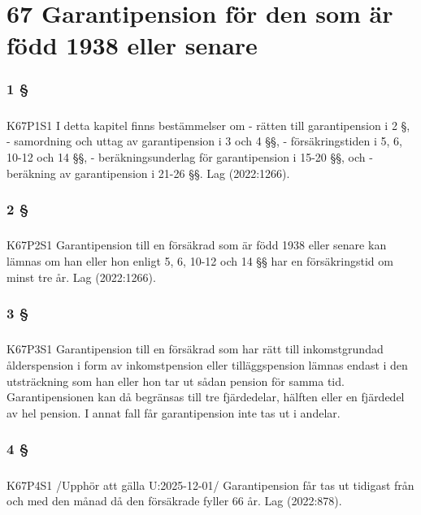 \documentclass[a4paper,notitlepage,openany,10pt]{book}
\begin{document}
\chapter*{67 Garantipension för den som är född 1938 eller senare}
\subsection*{1 §}
\paragraph*{}
{\tiny K67P1S1}
I detta kapitel finns bestämmelser om
\newline - rätten till garantipension i 2 §,
\newline - samordning och uttag av garantipension i 3 och 4 §§,
\newline - försäkringstiden i 5, 6, 10-12 och 14 §§,
\newline - beräkningsunderlag för garantipension i 15-20 §§, och
\newline - beräkning av garantipension i 21-26 §§.
Lag (2022:1266).
\subsection*{2 §}
\paragraph*{}
{\tiny K67P2S1}
Garantipension till en försäkrad som är född 1938 eller senare kan lämnas om han eller hon enligt 5, 6, 10-12 och 14 §§ har en försäkringstid om minst tre år.
Lag (2022:1266).
\subsection*{3 §}
\paragraph*{}
{\tiny K67P3S1}
Garantipension till en försäkrad som har rätt till inkomstgrundad ålderspension i form av inkomstpension eller tilläggspension lämnas endast i den utsträckning som han eller hon tar ut sådan pension för samma tid.
Garantipensionen kan då begränsas till tre fjärdedelar, hälften eller en fjärdedel av hel pension. I annat fall får garantipension inte tas ut i andelar.
\subsection*{4 §}
\paragraph*{}
{\tiny K67P4S1}
/Upphör att gälla U:2025-12-01/
Garantipension får tas ut tidigast från och med den månad då den försäkrade fyller 66 år.
Lag (2022:878).
\end{document}
